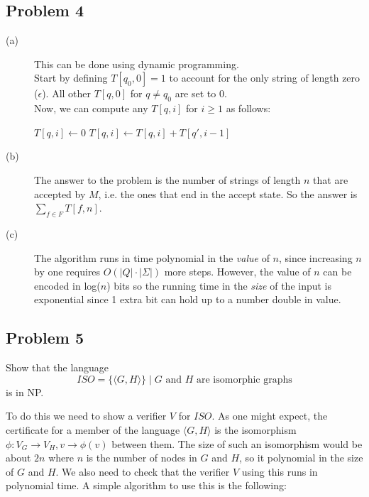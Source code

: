 \documentclass[english]{article}
\begin{document}
\subsection*{Problem 4}
\begin{description}
	\item[(a)] This can be done using dynamic programming.\\
	Start by defining $T[q_0,0] = 1$ to account for the only string of length zero ($\epsilon$).
	All other $T[q,0]$ for $q \ne q_0$ are set to 0.\\
	Now, we can compute any $T[q,i]$ for $i \ge 1$ as follows:
	\begin{algorithmic}
		\State $T[q,i] \gets 0$
				\State $T[q,i] \gets T[q,i] + T[q',i-1]$
			\EndIf
			\EndFor
		\EndFor
	\end{algorithmic}
	
	\item[(b)] The answer to the problem is the number of strings of length $n$ that are accepted
	by $M$, i.e. the ones that end in the accept state. So the answer is $\sum_{f \in F}T[f,n]$.
	
	\item[(c)] The algorithm runs in time polynomial in the \emph{value} of $n$, since increasing
	$n$ by one requires $O(|Q| \cdot |\Sigma|)$ more steps. However, the value of $n$ can be
	encoded in log($n$) bits so the running time in the \emph{size} of the input is exponential
	since 1 extra bit can hold up to a number double in value.
\end{description}

\subsection*{Problem 5}
Show that the language
\[ ISO = \{ \langle G, H \rangle \} \mid
		\textrm{$G$ and $H$ are isomorphic graphs} \]
is in NP.

To do this we need to show a verifier $V$ for $ISO$. As one might expect, the
certificate for a member of the language $\langle G, H \rangle$ is the
isomorphism $\phi: V_G \rightarrow V_H, v \rightarrow \phi(v)$ between them.
The size of such an isomorphism would be about $2n$ where $n$ is the number of
nodes in $G$ and $H$, so it polynomial in the size of $G$ and $H$. 
We also need to check that the verifier $V$ using this runs in polynomial
time. A simple algorithm to use this is the following:
\end{document}
